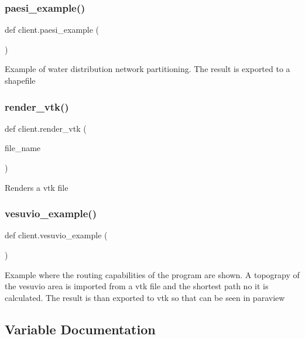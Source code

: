 \subsubsection{paesi\+\_\+example()}
{\footnotesize\ttfamily def client.\+paesi\+\_\+example (\begin{DoxyParamCaption}{ }\end{DoxyParamCaption})}

\begin{DoxyVerb}Example of water distribution network partitioning.
The result is exported to a shapefile
\end{DoxyVerb}
 \mbox{\label{namespaceclient_a8c66f26b466cc16db7e35d978f747c1b}} 
\subsubsection{render\+\_\+vtk()}
{\footnotesize\ttfamily def client.\+render\+\_\+vtk (\begin{DoxyParamCaption}\item[{}]{file\+\_\+name }\end{DoxyParamCaption})}

\begin{DoxyVerb}Renders a vtk file
\end{DoxyVerb}
 \mbox{\label{namespaceclient_a46574221d0ff1ae8e8877b760085a01e}} 
\subsubsection{vesuvio\+\_\+example()}
{\footnotesize\ttfamily def client.\+vesuvio\+\_\+example (\begin{DoxyParamCaption}{ }\end{DoxyParamCaption})}

\begin{DoxyVerb}Example where the routing capabilities of the program are shown.
A topograpy of the vesuvio area is imported from a vtk file and the shortest path no it is calculated.
The result is than exported to vtk so that can be seen in paraview
\end{DoxyVerb}
 

\subsection{Variable Documentation}
\mbox{\label{namespaceclient_a4a7ede8654de42bed4384b998cad47b0}} 
